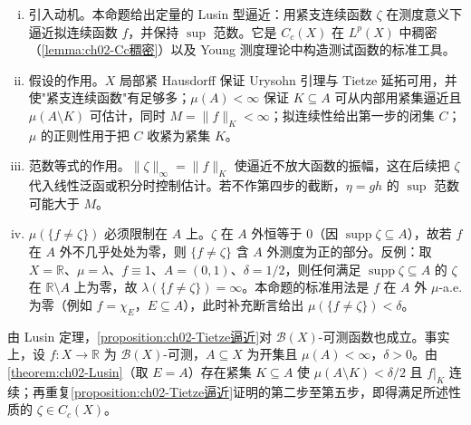 \documentclass[../../main.tex]{subfiles}%
\begin{document}
\begin{remark}\label{remark:ch02-Tietze逼近}
\begin{enumerate}[(i)]
\item 引入动机。本命题给出定量的 Lusin 型逼近：用紧支连续函数 $\zeta$ 在测度意义下逼近拟连续函数 $f$，并保持 $\sup$ 范数。它是 $C_c(X)$ 在 $L^p(X)$ 中稠密（\cref{lemma:ch02-Cc稠密}）以及 Young 测度理论中构造测试函数的标准工具。
\item 假设的作用。$X$ 局部紧 Hausdorff 保证 Urysohn 引理与 Tietze 延拓可用，并使"紧支连续函数"有足够多；$\mu(A)<\infty$ 保证 $K\subseteq A$ 可从内部用紧集逼近且 $\mu(A\setminus K)$ 可估计，同时 $M=\|f\|_K<\infty$；拟连续性给出第一步的闭集 $C$；$\mu$ 的正则性用于把 $C$ 收紧为紧集 $K$。
\item 范数等式的作用。$\|\zeta\|_\infty=\|f\|_K$ 使逼近不放大函数的振幅，这在后续把 $\zeta$ 代入线性泛函或积分时控制估计。若不作第四步的截断，$\eta=gh$ 的 $\sup$ 范数可能大于 $M$。
\item $\mu(\{f\neq\zeta\})$ 必须限制在 $A$ 上。$\zeta$ 在 $A$ 外恒等于 $0$（因 $\operatorname{supp}\zeta\subseteq A$），故若 $f$ 在 $A$ 外不几乎处处为零，则 $\{f\neq\zeta\}$ 含 $A$ 外测度为正的部分。反例：取 $X=\mathbb{R}$、$\mu=\lambda$、$f\equiv1$、$A=(0,1)$、$\delta=1/2$，则任何满足 $\operatorname{supp}\zeta\subseteq A$ 的 $\zeta$ 在 $\mathbb{R}\setminus A$ 上为零，故 $\lambda(\{f\neq\zeta\})=\infty$。本命题的标准用法是 $f$ 在 $A$ 外 $\mu$-a.e. 为零（例如 $f=\chi_E$，$E\subseteq A$），此时补充断言给出 $\mu(\{f\neq\zeta\})<\delta$。
\end{enumerate}
\end{remark}

\begin{remark}\label{remark:ch02-Lusin对可测函数}
由 Lusin 定理，\cref{proposition:ch02-Tietze逼近}对 $\mathscr B(X)$-可测函数也成立。事实上，设 $f:X\to\mathbb{R}$ 为 $\mathscr B(X)$-可测，$A\subseteq X$ 为开集且 $\mu(A)<\infty$，$\delta>0$。由\cref{theorem:ch02-Lusin}（取 $E=A$）存在紧集 $K\subseteq A$ 使 $\mu(A\setminus K)<\delta/2$ 且 $f|_K$ 连续；再重复\cref{proposition:ch02-Tietze逼近}证明的第二步至第五步，即得满足所述性质的 $\zeta\in C_c(X)$。
\end{remark}
\end{document}
